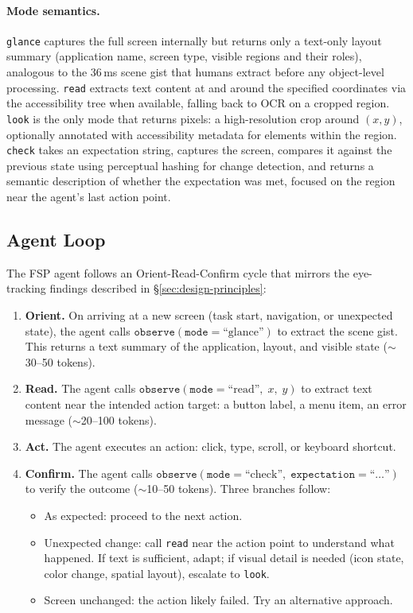 \documentclass[11pt,a4paper]{article}
\begin{document}
\paragraph{Mode semantics.}
\texttt{glance} captures the full screen internally but returns only a
text-only layout summary (application name, screen type, visible regions and
their roles), analogous to the 36\,ms scene gist that humans extract before
any object-level processing. \texttt{read} extracts text content at and
around the specified coordinates via the accessibility tree when available,
falling back to OCR on a cropped region. \texttt{look} is the only mode that
returns pixels: a high-resolution crop around $(x, y)$, optionally annotated
with accessibility metadata for elements within the region. \texttt{check}
takes an expectation string, captures the screen, compares it against the
previous state using perceptual hashing for change detection, and returns a
semantic description of whether the expectation was met, focused on the region
near the agent's last action point.

\subsection{Agent Loop}
\label{sec:agent-loop}

The FSP agent follows an Orient-Read-Confirm cycle that mirrors the
eye-tracking findings described in \S\ref{sec:design-principles}:

\begin{enumerate}[leftmargin=*,itemsep=2pt]
  \item \textbf{Orient.} On arriving at a new screen (task start, navigation,
    or unexpected state), the agent calls
    $\texttt{observe}(\texttt{mode}{=}\text{``glance''})$ to extract the scene
    gist. This returns a text summary of the application, layout, and visible
    state ($\sim$30--50 tokens).
  \item \textbf{Read.} The agent calls
    $\texttt{observe}(\texttt{mode}{=}\text{``read''},\; x,\; y)$ to extract
    text content near the intended action target: a button label, a menu item,
    an error message ($\sim$20--100 tokens).
  \item \textbf{Act.} The agent executes an action: click, type, scroll, or
    keyboard shortcut.
  \item \textbf{Confirm.} The agent calls
    $\texttt{observe}(\texttt{mode}{=}\text{``check''},\;
    \texttt{expectation}{=}\text{``\ldots''})$ to verify the outcome
    ($\sim$10--50 tokens). Three branches follow:
    \begin{itemize}[itemsep=1pt]
      \item As expected: proceed to the next action.
      \item Unexpected change: call \texttt{read} near the action
        point to understand what happened. If text is sufficient, adapt; if
        visual detail is needed (icon state, color change, spatial layout),
        escalate to \texttt{look}.
      \item Screen unchanged: the action likely failed. Try an
        alternative approach.
    \end{itemize}
\end{enumerate}
\end{document}

